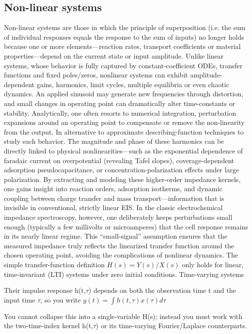 \subsection{Non-linear systems}
Non-linear systems are those in which the principle of superposition (i.e. the sum of individual responses equals the response to the sum of inputs) no longer holds because one or more elements—reaction rates, transport coefficients or material properties—depend on the current state or input amplitude. Unlike linear systems, whose behavior is fully captured by constant-coefficient ODEs, transfer functions and fixed poles/zeros, nonlinear systems can exhibit amplitude-dependent gains, harmonics, limit cycles, multiple equilibria or even chaotic dynamics. An applied sinusoid may generate new frequencies through distortion, and small changes in operating point can dramatically alter time-constants or stability. Analytically, one often resorts to numerical integration, perturbation expansions around an operating point to compensate or remove the non-linearity from the output. In alternative to approximate describing-function techniques to study such behavior. The magnitude and phase of these harmonics can be directly linked to physical nonlinearities—such as the exponential dependence of faradaic current on overpotential (revealing Tafel slopes), coverage-dependent adsorption pseudocapacitance, or concentration-polarization effects under large polarization. By extracting and modeling these higher-order impedance kernels, one gains insight into reaction orders, adsorption isotherms, and dynamic coupling between charge transfer and mass transport—information that is invisible in conventional, strictly linear EIS. 
In the classic electrochemical impedance spectroscopy, however, one deliberately keeps perturbations small enough (typically a few millivolts or microamperes) that the cell response remains in its nearly linear regime. This “small-signal” assumption ensures that the measured impedance truly reflects the linearized transfer function around the chosen operating point, avoiding the complications of nonlinear dynamics. 
The simple transfer-function definition $H(s)=Y(s)/X(s)$ only holds for linear, time-invariant (LTI) systems under zero initial conditions.
Time-varying systems

Their impulse response h(t,$\tau$) depends on both the observation time t and the input time $\tau$, so you write
$y(t)=\int h(t,\tau)x(\tau)d\tau$

You cannot collapse this into a single‐variable H(s); instead you must work with the two-time‐index kernel h(t,$\tau$) or its time-varying Fourier/Laplace counterparts.

